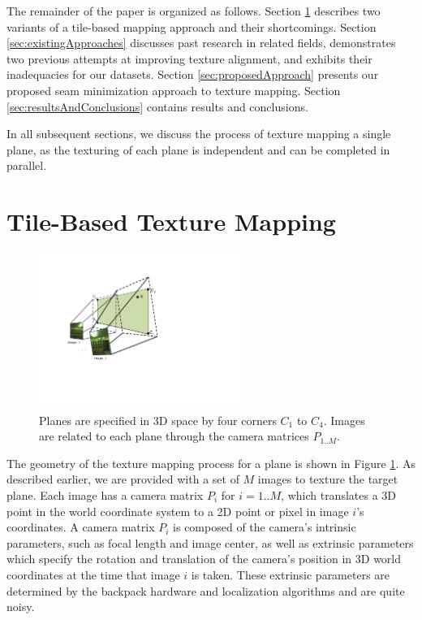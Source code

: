 \documentclass[10pt,twocolumn,letterpaper]{article}
\begin{document}
The remainder of the paper is organized as follows. Section
\ref{sec:simpleTextureMapping} describes two variants of a tile-based
mapping approach and their shortcomings.  Section
\ref{sec:existingApproaches} discusses past research in related
fields, demonstrates two previous attempts at improving texture
alignment, and exhibits their inadequacies for our datasets. Section
\ref{sec:proposedApproach} presents our proposed seam minimization
approach to texture mapping. Section \ref{sec:resultsAndConclusions}
contains results and conclusions.

In all subsequent sections, we discuss the process of texture mapping
a single plane, as the texturing of each plane is independent and can
be completed in parallel.

\section{Tile-Based Texture Mapping}
\label{sec:simpleTextureMapping}
\begin{figure}
  \centering
  \includegraphics[height=2in]{Projection.pdf}
  \caption{Planes are specified in 3D space by four corners $C_1$ to
    $C_4$. Images are related to each plane through the camera
    matrices $P_{1..M}$. }
  \label{fig:projection}
\end{figure}

The geometry of the texture mapping process for a plane is shown in
Figure \ref{fig:projection}.  As described earlier, we are provided
with a set of $M$ images to texture the target
plane. Each image has a camera matrix $P_i$ for $i=1..M$, which
translates a 3D point in the world coordinate system to a 2D point or
pixel in image $i$'s coordinates. A camera matrix $P_i$ is composed of
the camera's intrinsic parameters, such as focal length and image
center, as well as extrinsic parameters which specify the rotation and
translation of the camera's position in 3D world coordinates at the
time that image $i$ is taken. These extrinsic parameters are
determined by the backpack hardware and localization algorithms
\cite{chen2010indoor, liu2010indoor, kua2012loopclosure} and are quite
noisy.
\end{document}
